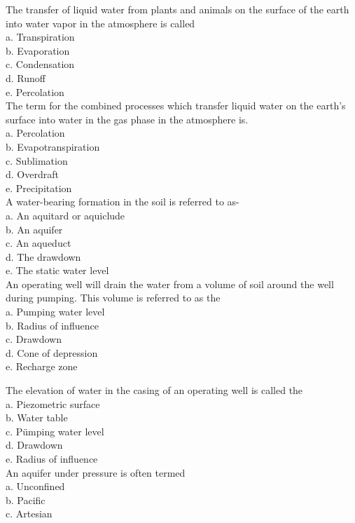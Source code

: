 The transfer of liquid water from plants and animals on the surface of the earth into water vapor in the atmosphere is called\\
a. Transpiration\\
b. Evaporation\\
c. Condensation\\
d. Runoff\\
e. Percolation\\

The term for the combined processes which transfer liquid water on the earth's surface into water in the gas phase in the atmosphere is.\\
a. Percolation\\
b. Evapotranspiration\\
c. Sublimation\\
d. Overdraft\\
e. Precipitation\\

A water-bearing formation in the soil is referred to as-\\
a. An aquitard or aquiclude\\
b. An aquifer\\
c. An aqueduct\\
d. The drawdown\\
e. The static water level\\

An operating well will drain the water from a volume of soil around the well during pumping. This volume is referred to as the\\
a. Pumping water level\\
b. Radius of influence\\
c. Drawdown\\
d. Cone of depression\\
e. Recharge zone

The elevation of water in the casing of an operating well is called the\\
a. Piezometric surface\\
b. Water table\\
c. Pümping water level\\
d. Drawdown\\
e. Radius of influence\\

An aquifer under pressure is often termed\\
a. Unconfined\\
b. Pacific\\
c. Artesian\\

